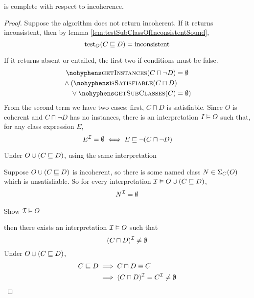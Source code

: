 \documentclass[paper.tex]{subfiles}
\begin{document}
\begin{lemma}
  \label{lem:testSubClassOfIncoherentComplete}
   is complete with respect to incoherence.
\end{lemma}
\begin{proof}
  Suppose the algorithm does not return incoherent.  If it returns inconsistent, then by lemma \ref{lem:testSubClassOfInconsistentSound},
  \[ \operatorname{test}_O(C \sqsubseteq D) = \mathrm{inconsistent} \]

  If it returns absent or entailed, the first two if-conditions must be false.
  \begin{multline*}
    \textproc{getInstances}(C \sqcap \neg D) = \emptyset \\
    {} \land \begin{aligned}[t]
      & (\textproc{isSatisfiable}(C \sqcap D) \\
      & \lor \textproc{getSubClasses}(C) = \emptyset)
    \end{aligned}
  \end{multline*}
  From the second term we have two cases: first, $C \sqcap D$ is satisfiable.  Since $O$ is coherent and $C \sqcap \neg D$ has no instances, there is an interpretation $I \vDash O$ such that, for any class expression $E$,
  \[ E^{\mathcal{I}} = \emptyset \iff E \sqsubseteq \neg (C \sqcap \neg D) \]


  Under $O \cup (C \sqsubseteq D)$, using the same interpretation

  Suppose $O \cup (C \sqsubseteq D)$ is incoherent, so there is some named class $N \in \Sigma_C(O)$ which is unsatisfiable.  So for every interpretation $\mathcal{I} \vDash O \cup (C \sqsubseteq D)$,
  \begin{align*}
    N^{\mathcal{I}} = \emptyset
  \end{align*}

  \todo Show $\mathcal{I} \vDash O$

  then there exists an interpretation $\mathcal{I} \vDash O$ such that
  \[ (C \sqcap D)^{\mathcal{I}} \ne \emptyset \]
  Under $O \cup (C \sqsubseteq D)$,
  \begin{align*}
    C \sqsubseteq D \implies{}& C \sqcap D \equiv C \\
    \implies{}& (C \sqcap D)^{\mathcal{I}} = C^{\mathcal{I}} \ne \emptyset
  \end{align*}





\end{proof}
\end{document}
